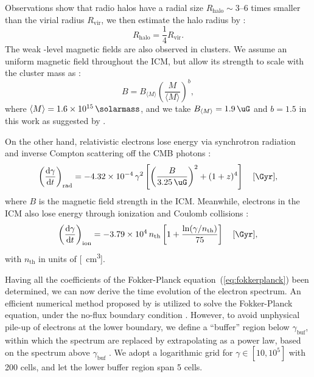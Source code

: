 \documentclass[modern]{aastex61}
\newcommand{\R}[1]{\mathrm{#1}}
\newcommand{\D}[1]{\R{d} #1}
\newcommand{\diff}[2]{\frac{\D{#1}}{\D{#2}}}
\begin{document}
Observations show that radio halos have a radial size
$R_{\R{halo}} \sim \numrange{3}{6}$ times smaller than the virial radius
$R_{\R{vir}}$, we then estimate the halo radius by
\citep{cassano2007,zandanel2014}:
\begin{equation}
  \label{eq:rhalo-rvir}
  R_{\R{halo}} = \frac{1}{4} R_{\R{vir}}.
\end{equation}
The weak \si{\uG}-level magnetic fields are also observed in clusters.
We assume an uniform magnetic field throughout the ICM,
but allow its strength to scale with the cluster mass as \citep{cassano2012}:
\begin{equation}
  \label{eq:magfield-mass}
  B = B_{\langle{M}\rangle} \left( \frac{M}{\langle{M}\rangle} \right)^b,
\end{equation}
where $\langle {M} \rangle = \SI{1.6e15}{\solarmass}$, and we take
$B_{\langle {M} \rangle} = \SI{1.9}{\uG}$ and $b = 1.5$ in this work
as suggested by \citet{cassano2006}.

On the other hand,
relativistic electrons lose energy via synchrotron radiation
and inverse Compton scattering off the CMB photons \citep{sarazin1999}:
\begin{equation}
  \label{eq:eloss-rad}
  \left( \diff{\gamma}{t} \right)_{\R{rad}} =
  \num{-4.32e-4} \,\gamma^2
  \left[ \left( \frac{B}{\SI{3.25}{\uG}} \right)^2 +
  (1+z)^4 \right] \quad [\si{\per\Gyr}],
\end{equation}
where $B$ is the magnetic field strength in the ICM.
Meanwhile, electrons in the ICM also lose energy through
ionization and Coulomb collisions \citep{sarazin1999}:
\begin{equation}
  \label{eq:eloss-ion}
  \left( \diff{\gamma}{t} \right)_{\R{ion}} =
  \num{-3.79e4} \,n_{\R{th}} \left[ 1 +
    \frac{\ln(\gamma/n_{\R{th}})}{75} \right] \quad [\si{\per\Gyr}],
\end{equation}
with $n_{\R{th}}$ in units of [\si{\per\cm\cubed}].

Having all the coefficients of the Fokker-Planck
equation~(\ref{eq:fokkerplanck}) been determined, we can now derive
the time evolution of the electron spectrum.
An efficient numerical method proposed by \citet{chang1970} is
utilized to solve the Fokker-Planck equation, under the no-flux boundary
condition \citep{park1996}.
However, to avoid unphysical pile-up of electrons at the lower boundary,
we define a \enquote{buffer} region below $\gamma_{\R{buf}}$, within which
the spectrum are replaced by extrapolating as a power law, based on
the spectrum above $\gamma_{\R{buf}}$ \citep{donnert2014}.
We adopt a logarithmic grid for $\gamma \in [10, 10^5]$ with 200 cells,
and let the lower buffer region span 5 cells.
\end{document}
